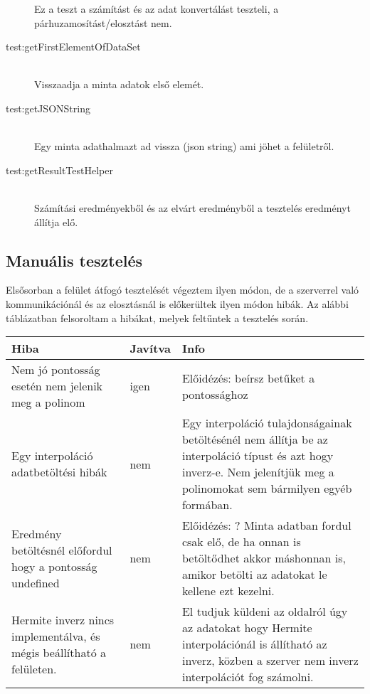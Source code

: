 \begin{description}
			Ez a teszt a számítást és az adat konvertálást teszteli, a párhuzamosítást/elosztást nem.
		\item[test:getFirstElementOfDataSet] \hfill \\
			Visszaadja a minta adatok első elemét.
		\item[test:getJSONString] \hfill \\
			Egy minta adathalmazt ad vissza (json string) ami jöhet a felületről.
		\item[test:getResultTestHelper] \hfill \\
			Számítási eredményekből és az elvárt eredményből a tesztelés eredményt állítja elő. 
	\end{description}

\subsection{Manuális tesztelés}
	Elsősorban a felület átfogó tesztelését végeztem ilyen módon, de a szerverrel való kommunikációnál és az elosztásnál is előkerültek ilyen módon hibák. \newline
	Az alábbi táblázatban felsoroltam a hibákat, melyek feltűntek a tesztelés során. 
	\begin{center}
  	\begin{tabular}{| p{4cm} | p{1.5cm} | p{8cm} |}
    \hline
    Hiba & Javítva & Info
  	\\ \hline
        Nem jó pontosság esetén nem jelenik meg a polinom
      &
      	igen
      &
		Előidézés: beírsz betűket a pontossághoz 
    \\ \hline
        Egy interpoláció adatbetöltési hibák
      &
      	nem
      &
      	Egy interpoláció tulajdonságainak betöltésénél nem állítja be az interpoláció típust és azt hogy inverz-e.
      	Nem jelenítjük meg a polinomokat sem bármilyen egyéb formában.
    \\ \hline
        Eredmény betöltésnél előfordul hogy a pontosság undefined 
      &
      	nem
      &
		Előidézés: ? Minta adatban fordul csak elő, de ha onnan  is betöltődhet akkor máshonnan is, amikor betölti az adatokat le kellene ezt kezelni.
    \\ \hline
    	Hermite inverz nincs implementálva, és mégis beállítható a felületen.  
      &
      	nem
      &
		El tudjuk küldeni az oldalról úgy az adatokat hogy Hermite interpolációnál is állítható az inverz, közben a szerver nem inverz interpolációt fog számolni.
	\\ \hline
  \end{tabular}\end{center}
